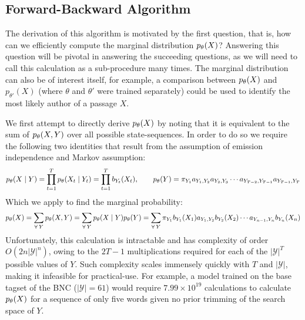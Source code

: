 \documentclass[../main.tex]{subfiles}
\begin{document}
\subsection{Forward-Backward Algorithm}

The derivation of this algorithm is motivated by the first question, that is, how can we efficiently compute the marginal distribution $p_\theta(X)$? Answering this question will be pivotal in answering the succeeding questions, as we will need to call this calculation as a sub-procedure many times.
The marginal distribution can also be of interest itself, for example, a comparison between $p_\theta(X)$ and $p_{\theta'}(X)$ (where $\theta$ and $\theta'$ were trained separately) could be used to identify the most likely author of a passage $X$.

We first attempt to directly derive $p_\theta(X)$ by noting that it is equivalent to the sum of $p_\theta(X, Y)$ over all possible state-sequences. In order to do so we require the following two identities that result from the assumption of emission independence and Markov assumption:
\begin{equation*}
    p_\theta(X \mid Y) = \prod_{t=1}^T p_\theta(X_t \mid Y_t) = \prod_{t=1}^T b_{Y_t}(X_t), \qquad
    p_\theta(Y) = \pi_{Y_1} a_{Y_1,Y_2} a_{Y_2,Y_3} \cdots a_{Y_{T-2},Y_{T-1}} a_{Y_{T-1},Y_T}
\end{equation*}
Which we apply to find the marginal probability:
\begin{equation*}
    p_\theta(X) = \sum_{\forall \: Y} p_\theta(X,Y) = \sum_{\forall \: Y} p_\theta(X \mid Y) p_\theta(Y) = \sum_{\forall \: Y} \pi_{Y_1} b_{Y_1}(X_1) a_{Y_1, Y_2} b_{Y_2}(X_2) \cdots a_{Y_{n-1}, Y_n} b_{Y_n}(X_n)
\end{equation*}
Unfortunately, this calculation is intractable and has complexity of order $O(2n|\mathcal{Y}|^n)$, owing to the $2T - 1$ multiplications required for each of the $|\mathcal{Y}|^T$ possible values of $Y$.
Such complexity scales immensely quickly with $T$ and $|\mathcal{Y}|$, making it infeasible for practical-use. For example, a model trained on the base tagset of the BNC ($|\mathcal{Y}|=61$) \autocite{bnc-corpus} would require $7.99 \times 10^{19}$ calculations to calculate $p_\theta(X)$ for a sequence of only five words given no prior trimming of the search space of $Y$.
\end{document}
